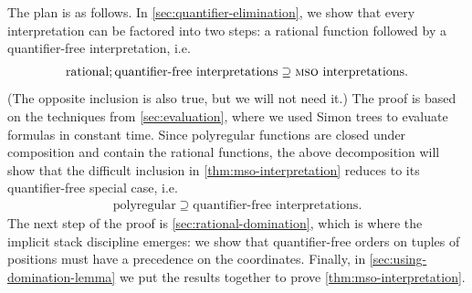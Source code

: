 The plan is as follows.
 In \cref{sec:quantifier-elimination},  we show that
 every \mso interpretation can be factored into two steps: a rational function  followed by a quantifier-free interpretation, i.e.
\begin{align*}
 \text{rational}; \text{quantifier-free interpretations} 
 \supseteq \text{\mso interpretations.}
\end{align*}
(The opposite inclusion is also true, but we will not need it.)  
The proof is based on the techniques from \cref{sec:evaluation}, where we used Simon trees to evaluate \mso formulas in constant time.  
 Since polyregular functions are closed under composition and contain the rational functions, the above decomposition will show that the difficult inclusion in \cref{thm:mso-interpretation} reduces to its quantifier-free special case, i.e. 
 \begin{align*}
\text{polyregular} \supseteq \text{quantifier-free interpretations}.
 \end{align*}
The next step of the proof is \cref{sec:rational-domination},  which is where the implicit stack discipline emerges:  we show that quantifier-free orders on tuples of positions must have a precedence on the coordinates. Finally, in \cref{sec:using-domination-lemma} we put the results together to prove \cref{thm:mso-interpretation}.

